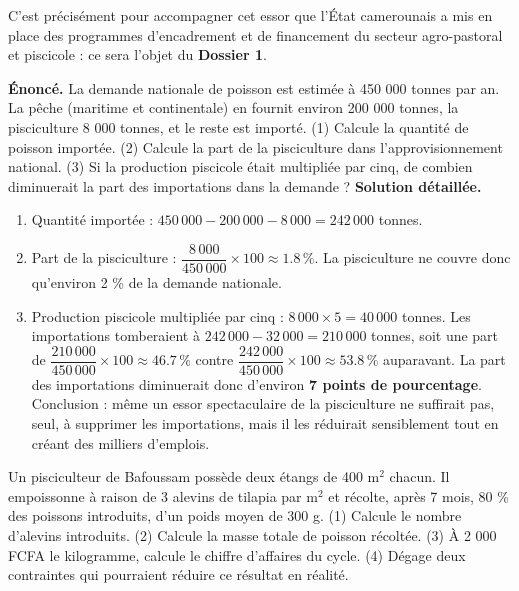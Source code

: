 \documentclass[11pt]{article}
\begin{document}
C'est précisément pour accompagner cet essor que l'État camerounais a mis en place des programmes d'encadrement et de financement du secteur agro-pastoral et piscicole : ce sera l'objet du \textbf{Dossier 1}.

\begin{exoresolu}
\textbf{Énoncé.} La demande nationale de poisson est estimée à 450 000 tonnes par an. La pêche (maritime et continentale) en fournit environ 200 000 tonnes, la pisciculture 8 000 tonnes, et le reste est importé. (1) Calcule la quantité de poisson importée. (2) Calcule la part de la pisciculture dans l'approvisionnement national. (3) Si la production piscicole était multipliée par cinq, de combien diminuerait la part des importations dans la demande ?
\tcblower
\textbf{Solution détaillée.}
\begin{enumerate}
\item Quantité importée : $450\,000 - 200\,000 - 8\,000 = 242\,000$ tonnes.
\item Part de la pisciculture : $\dfrac{8\,000}{450\,000} \times 100 \approx \num{1,8}\,\%$. La pisciculture ne couvre donc qu'environ 2 \% de la demande nationale.
\item Production piscicole multipliée par cinq : $8\,000 \times 5 = 40\,000$ tonnes. Les importations tomberaient à $242\,000 - 32\,000 = 210\,000$ tonnes, soit une part de $\dfrac{210\,000}{450\,000} \times 100 \approx \num{46,7}\,\%$ contre $\dfrac{242\,000}{450\,000} \times 100 \approx \num{53,8}\,\%$ auparavant. La part des importations diminuerait donc d'environ \textbf{7 points de pourcentage}. Conclusion : même un essor spectaculaire de la pisciculture ne suffirait pas, seul, à supprimer les importations, mais il les réduirait sensiblement tout en créant des milliers d'emplois.
\end{enumerate}
\end{exoresolu}

\begin{exercice}
Un pisciculteur de Bafoussam possède deux étangs de 400 m$^2$ chacun. Il empoissonne à raison de 3 alevins de tilapia par m$^2$ et récolte, après 7 mois, 80 \% des poissons introduits, d'un poids moyen de 300 g. (1) Calcule le nombre d'alevins introduits. (2) Calcule la masse totale de poisson récoltée. (3) À 2 000 FCFA le kilogramme, calcule le chiffre d'affaires du cycle. (4) Dégage deux contraintes qui pourraient réduire ce résultat en réalité.
\end{exercice}
\end{document}
